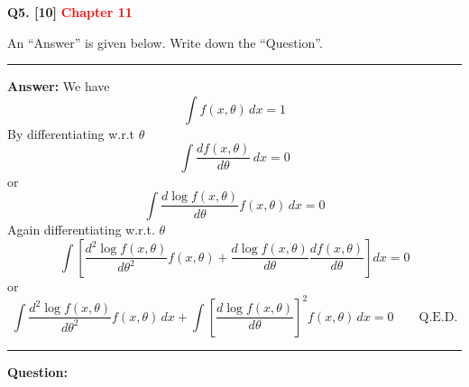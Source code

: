 \documentclass[11pt]{article}
\begin{document}
\bigskip
\textbf{Q5. [10]}  \textbf{\textcolor{red}{Chapter 11}}

An ``Answer'' is given below. Write down the ``Question''.

\medskip
\hrule
\medskip

\textbf{Answer:} We have
\[
\int f(x,\theta)\,dx=1
\]
By differentiating w.r.t $\theta$
\[
\int\frac{df(x,\theta)}{d\theta}\,dx=0
\]
or
\[
\int\frac{d\log f(x,\theta)}{d\theta}f(x,\theta)\,dx=0
\]
Again differentiating w.r.t. $\theta$
\[
\int\left[\frac{d^2\log f(x,\theta)}{d\theta^2}f(x,\theta)+
\frac{d\log f(x,\theta)}{d\theta}\frac{df(x,\theta)}{d\theta}\right]dx=0
\]
or
\[
\int\frac{d^2\log f(x,\theta)}{d\theta^2}f(x,\theta)\,dx
+\int\left[\frac{d\log f(x,\theta)}{d\theta}\right]^2 f(x,\theta)\,dx=0
\qquad \text{Q.E.D.}
\]

\medskip
\hrule
\medskip
\textbf{Question:}
\end{document}
